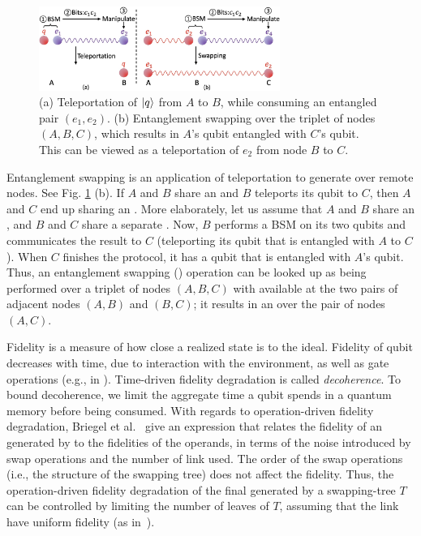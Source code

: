 \begin{figure}
    \centering
    \includegraphics[width=0.7\textwidth]{chapters/swappingtrees/figures/teleportation_swapping.jpg}
    \caption{(a)  Teleportation of $\ket{q}$ from $A$ to $B$, while consuming an entangled pair $(e_1, e_2)$. (b) Entanglement swapping over the triplet of nodes $(A, B, C)$, which results in $A$'s qubit entangled with $C$'s qubit. This can be viewed as a teleportation of $e_2$ from node $B$ to $C$.}
  \label{fig:swapping_teleport_swap}
\end{figure}

Entanglement swapping is an application of teleportation 
to generate \epss over remote nodes. See Fig. \ref{fig:swapping_teleport_swap} (b).
If $A$ and $B$ share an \eps  and $B$ teleports its qubit to $C$, then 
 $A$ and $C$ end up sharing an \eps. 
More elaborately, let us assume that $A$ and $B$
share an \eps, and $B$ and $C$ share a separate \eps. 
Now, $B$ performs a  BSM 
on its two qubits and communicates the result to $C$ (teleporting its 
 qubit that is entangled with $A$ to $C$). When $C$ finishes the protocol, it has a qubit
that is entangled with $A$'s qubit. Thus, an entanglement swapping (\es)
 operation can be looked up as being performed over a triplet of nodes $(A, B, C)$ 
with \eps available 
at the 
two pairs of adjacent nodes $(A, B)$ and $(B,C)$; it results in an \eps over the pair
of nodes $(A, C)$. 

Fidelity is a measure of how close a realized state is to the ideal. 
Fidelity of qubit decreases with time, due to interaction with the environment,
as well as gate operations (e.g., in \es). 
Time-driven fidelity degradation is called \emph{decoherence}. 
To bound decoherence, we limit the aggregate time a qubit spends in a 
quantum memory before being consumed.
With regards to operation-driven fidelity degradation, 
Briegel et al.~\cite{BreigelEtAl1998} give an expression 
that relates the fidelity of an \eps generated by \es 
to the fidelities of the operands,  in terms of the 
noise introduced by swap operations and the number of link \epss used. The order of the swap operations (i.e., the structure of the 
swapping tree) does not affect the fidelity. 
Thus, the operation-driven fidelity degradation of the final \eps 
generated by a swapping-tree $T$
can be controlled by limiting the number of leaves of $T$, assuming that
the link \epss have uniform fidelity (as in~\cite{delft-lp}).

